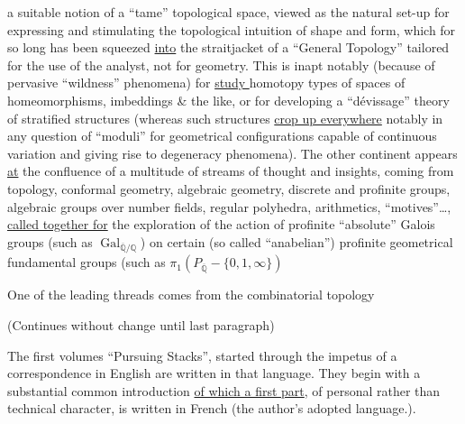 a suitable notion of a ``tame'' topological space, viewed as the natural set-up for expressing and stimulating the topological intuition of shape and form, which for so long has been squeezed \uline{into} the straitjacket of a ``General Topology'' tailored for the use of the analyst, not for geometry. This is inapt notably (because of pervasive ``wildness'' phenomena) for \uline{ study } homotopy types of spaces of homeomorphisms, imbeddings \& the like, or for developing a  ``dévissage'' theory of stratified structures (whereas such structures  \uline{crop up everywhere} notably in any question of ``moduli'' for geometrical configurations capable of continuous variation and giving rise to degeneracy phenomena). The other continent appears \uline{at} the confluence of a multitude of streams of thought and insights, coming from topology, conformal geometry, algebraic geometry, discrete and profinite groups, algebraic groups over number fields, regular polyhedra, arithmetics, ``motives''\ldots, \uline{called together for} the exploration of the action of profinite ``absolute'' Galois groups (such as $\operatorname{Gal}_{\overline{\mathbb{Q}}/\mathbb{Q}}$) on certain (so called ``anabelian'') profinite geometrical fundamental groups (such as $\pi_{1}(P_{\overline{\mathbb{Q}}}-\{0,1,\infty\})$

One of the leading threads comes from the combinatorial topology

(Continues without change until last paragraph)

The  first  volumes ``Pursuing Stacks'', started\unsure{\textendash|,} through the impetus of a correspondence in English are written in that language. They begin with a substantial common introduction \uline{of which a first part}, of personal rather than technical character, is written in French (the author's adopted language.).

